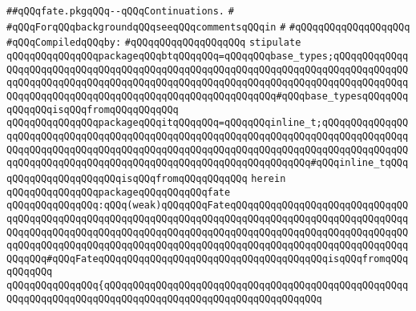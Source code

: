 \label{src/lib/std/src/nj/fate.pkg}
\verb|##qQQqfate.pkgqQQq--qQQqContinuations.|\newline
\verb|#|\newline
\verb|#qQQqForqQQqbackgroundqQQqseeqQQqcommentsqQQqin|\newline
\verb|#|\newline
\verb|#qQQqqQQqqQQqqQQqqQQq|\newline
\newline
\verb|#qQQqCompiledqQQqby:|\newline
\verb|#qQQqqQQqqQQqqQQqqQQq|\newline
\newline
\newline
\verb|stipulate|\newline
\verb|qQQqqQQqqQQqqQQqpackageqQQqbtqQQqqQQq=qQQqqQQqbase_types;qQQqqQQqqQQqqQQqqQQqqQQqqQQqqQQqqQQqqQQqqQQqqQQqqQQqqQQqqQQqqQQqqQQqqQQqqQQqqQQqqQQqqQQqqQQqqQQqqQQqqQQqqQQqqQQqqQQqqQQqqQQqqQQqqQQqqQQqqQQqqQQqqQQqqQQqqQQqqQQqqQQqqQQqqQQqqQQqqQQqqQQqqQQqqQQqqQQqqQQq#qQQqbase_typesqQQqqQQqqQQqqQQqisqQQqfromqQQqqQQqqQQq|\newline
\verb|qQQqqQQqqQQqqQQqpackageqQQqitqQQqqQQq=qQQqqQQqinline_t;qQQqqQQqqQQqqQQqqQQqqQQqqQQqqQQqqQQqqQQqqQQqqQQqqQQqqQQqqQQqqQQqqQQqqQQqqQQqqQQqqQQqqQQqqQQqqQQqqQQqqQQqqQQqqQQqqQQqqQQqqQQqqQQqqQQqqQQqqQQqqQQqqQQqqQQqqQQqqQQqqQQqqQQqqQQqqQQqqQQqqQQqqQQqqQQqqQQqqQQqqQQqqQQq#qQQqinline_tqQQqqQQqqQQqqQQqqQQqqQQqisqQQqfromqQQqqQQqqQQq|\newline
\verb|herein|\newline
\newline
\verb|qQQqqQQqqQQqqQQqpackageqQQqqQQqqQQqfate|\newline
\verb|qQQqqQQqqQQqqQQq:qQQq(weak)qQQqqQQqFateqQQqqQQqqQQqqQQqqQQqqQQqqQQqqQQqqQQqqQQqqQQqqQQqqQQqqQQqqQQqqQQqqQQqqQQqqQQqqQQqqQQqqQQqqQQqqQQqqQQqqQQqqQQqqQQqqQQqqQQqqQQqqQQqqQQqqQQqqQQqqQQqqQQqqQQqqQQqqQQqqQQqqQQqqQQqqQQqqQQqqQQqqQQqqQQqqQQqqQQqqQQqqQQqqQQqqQQqqQQqqQQqqQQqqQQqqQQqqQQqqQQqqQQq#qQQqFateqQQqqQQqqQQqqQQqqQQqqQQqqQQqqQQqqQQqqQQqisqQQqfromqQQqqQQqqQQq|\newline
\verb|qQQqqQQqqQQqqQQq{qQQqqQQqqQQqqQQqqQQqqQQqqQQqqQQqqQQqqQQqqQQqqQQqqQQqqQQqqQQqqQQqqQQqqQQqqQQqqQQqqQQqqQQqqQQqqQQqqQQqqQQqqQQq|\newline
